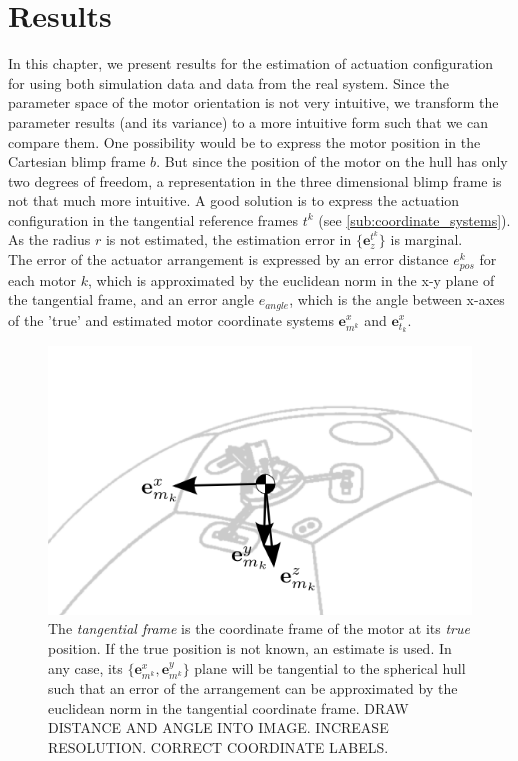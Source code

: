 \chapter{Results}
\label{chap:simulation_results}

In this chapter, we present results for the estimation of actuation configuration for using both simulation data and data from the real system.
Since the parameter space of the motor orientation is not very intuitive, we transform the parameter results (and its variance) to a more intuitive form such that we can compare them.
One possibility would be to express the motor position in the Cartesian blimp frame $b$.
But since the position of the motor on the hull has only two degrees of freedom, a representation in the three dimensional blimp frame is not that much more intuitive.
A good solution is to express the actuation configuration in the tangential reference frames $t^k$ (see \cref{sub:coordinate_systems}).
As the radius $r$ is not estimated, the estimation error in
$\lbrace \mathbf{e}^{t^k}_z \rbrace$ is marginal.
\\
The error of the actuator arrangement is expressed by an error distance $e_{pos}^k$ for each motor $k$, which is approximated by the euclidean norm in the x-y plane of the tangential frame,
and an error angle $e_{angle}$, which is the angle between x-axes of the 'true' and estimated motor coordinate systems $\mathbf{e}_{m^k}^x$ and $\mathbf{e}_{t_k}^x$.

\begin{figure}[hbtp]
\centering
\includegraphics[scale=1]{images/tangential_frame.png}
\caption{The \textit{tangential frame} is the coordinate frame of the motor at its \textit{true} position. If the true position is not known, an estimate is used. In any case, its $\lbrace \mathbf{e}^x_{m^k} , \mathbf{e}^y_{m^k} \rbrace$ plane will be tangential to the spherical hull such that an error of the arrangement can be approximated by the euclidean norm in the tangential coordinate frame.
DRAW DISTANCE AND ANGLE INTO IMAGE. INCREASE RESOLUTION. CORRECT COORDINATE LABELS.}
\label{fig:tangential_frame}
\end{figure}

